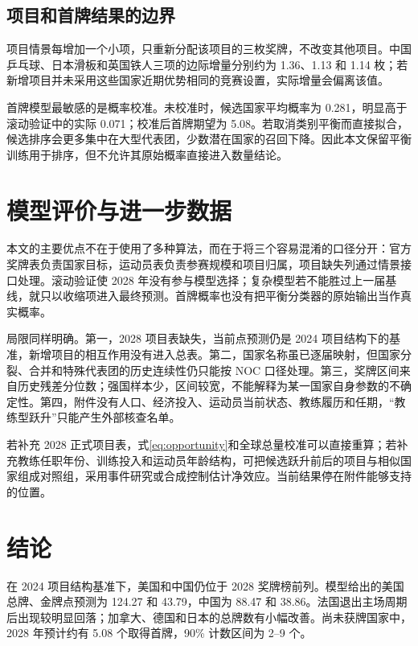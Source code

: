 \documentclass[UTF8,11pt,a4paper]{ctexart}
\begin{document}
\subsection{项目和首牌结果的边界}

项目情景每增加一个小项，只重新分配该项目的三枚奖牌，不改变其他项目。中国乒乓球、日本滑板和英国铁人三项的边际增量分别约为 1.36、1.13 和 1.14 枚；若新增项目并未采用这些国家近期优势相同的竞赛设置，实际增量会偏离该值。

首牌模型最敏感的是概率校准。未校准时，候选国家平均概率为 0.281，明显高于滚动验证中的实际 0.071；校准后首牌期望为 5.08。若取消类别平衡而直接拟合，候选排序会更多集中在大型代表团，少数潜在国家的召回下降。因此本文保留平衡训练用于排序，但不允许其原始概率直接进入数量结论。

\section{模型评价与进一步数据}

本文的主要优点不在于使用了多种算法，而在于将三个容易混淆的口径分开：官方奖牌表负责国家目标，运动员表负责参赛规模和项目归属，项目缺失列通过情景接口处理。滚动验证使 2028 年没有参与模型选择；复杂模型若不能胜过上一届基线，就只以收缩项进入最终预测。首牌概率也没有把平衡分类器的原始输出当作真实概率。

局限同样明确。第一，2028 项目表缺失，当前点预测仍是 2024 项目结构下的基准，新增项目的相互作用没有进入总表。第二，国家名称虽已逐届映射，但国家分裂、合并和特殊代表团的历史连续性仍只能按 NOC 口径处理。第三，奖牌区间来自历史残差分位数；强国样本少，区间较宽，不能解释为某一国家自身参数的不确定性。第四，附件没有人口、经济投入、运动员当前状态、教练履历和任期，“教练型跃升”只能产生外部核查名单。

若补充 2028 正式项目表，式\eqref{eq:opportunity}和全球总量校准可以直接重算；若补充教练任职年份、训练投入和运动员年龄结构，可把候选跃升前后的项目与相似国家组成对照组，采用事件研究或合成控制估计净效应。当前结果停在附件能够支持的位置。

\section{结论}

在 2024 项目结构基准下，美国和中国仍位于 2028 奖牌榜前列。模型给出的美国总牌、金牌点预测为 124.27 和 43.79，中国为 88.47 和 38.86。法国退出主场周期后出现较明显回落；加拿大、德国和日本的总牌数有小幅改善。尚未获牌国家中，2028 年预计约有 5.08 个取得首牌，90\% 计数区间为 2--9 个。
\end{document}
